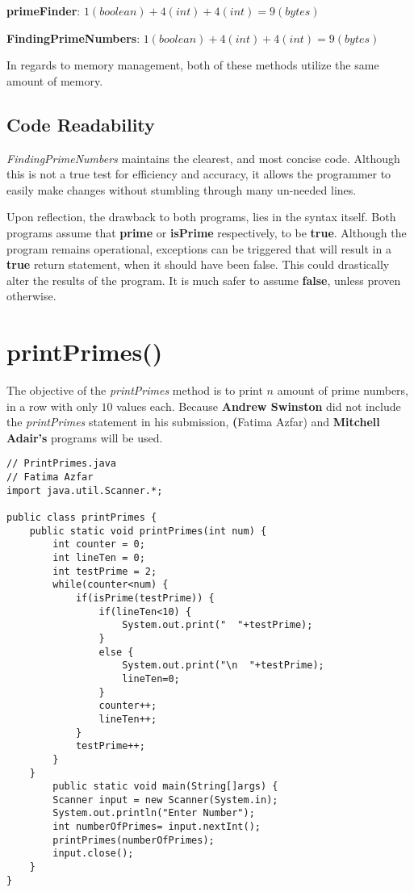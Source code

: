 \documentclass[12pt]{article}
\begin{document}
\textbf{primeFinder}: $1 (boolean)  + 4 (int) + 4 (int)  =  9(bytes)$

\textbf{FindingPrimeNumbers}: $1 (boolean) + 4 (int) + 4(int) = 9(bytes)$ 
 
 
In regards to memory management, both of these methods utilize the same amount of memory. 

\subsection{Code Readability}
\textit{FindingPrimeNumbers} maintains the clearest, and most concise code.  Although this is not a true test for efficiency and accuracy, it allows the programmer to easily make changes without stumbling through many un-needed lines. 

Upon reflection, the drawback to both programs, lies in the syntax itself.  Both programs assume that \textbf{prime} or \textbf{isPrime} respectively, to be \textbf{true}.  Although the program remains operational, exceptions can be triggered that will result in a \textbf{true} return statement, when it should have been false.  This could drastically alter the results of the program.  It is much safer to assume \textbf{false}, unless proven otherwise.

\section{printPrimes()}
The objective of the \textit{printPrimes} method is to print $n$ amount of prime numbers, in a row with only $10$ values each.  Because \textbf{Andrew Swinston} did not include the \textit{printPrimes} statement in his submission, \textbf(Fatima Azfar) and \textbf{Mitchell Adair's} programs will be used. 

\begin{lstlisting}
// PrintPrimes.java
// Fatima Azfar
import java.util.Scanner.*; 

public class printPrimes {
	public static void printPrimes(int num) {
		int counter = 0;
		int lineTen = 0;
		int testPrime = 2;
		while(counter<num) {
			if(isPrime(testPrime)) {
				if(lineTen<10) {
					System.out.print("  "+testPrime);		
				}
				else {
					System.out.print("\n  "+testPrime);
					lineTen=0;
				}
				counter++;
				lineTen++;
			}			
			testPrime++;
		}
	}
		public static void main(String[]args) {
		Scanner input = new Scanner(System.in);
		System.out.println("Enter Number");
		int numberOfPrimes= input.nextInt();
		printPrimes(numberOfPrimes);
		input.close();
	}
}
\end{lstlisting}
\end{document}

